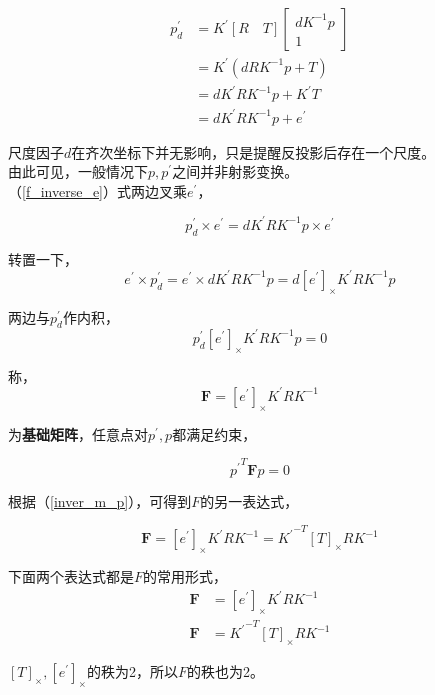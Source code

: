 		\begin{align}
			p^{\prime}_d &= K^{\prime}[R\quad T]
			\begin{bmatrix}
				dK^{-1}p\\
				1
			\end{bmatrix}\nonumber\\
			&= K^{\prime}\left(dRK^{-1}p + T\right)\nonumber\\
			&= dK^{\prime}RK^{-1}p + K^{\prime}T\label{f_inverse}\\
			&= dK^{\prime}RK^{-1}p + e^\prime\label{f_inverse_e}
		\end{align}

		尺度因子$d$在齐次坐标下并无影响，只是提醒反投影后存在一个尺度。\\

		由此可见，一般情况下$p,p^\prime$之间并非射影变换。\\

		（\ref{f_inverse_e}）式两边叉乘$e^\prime$，

		$$
			p^{\prime}_d\times e^\prime = dK^{\prime}RK^{-1}p \times e^\prime
		$$

		转置一下，
		$$
			e^\prime \times p^{\prime}_d = e^\prime \times dK^{\prime}RK^{-1}p = d[e^\prime]_{\times}K^{\prime}RK^{-1}p
		$$

		两边与$p^\prime_d$作内积，
		$$
			p^\prime_d [e^\prime]_{\times}K^{\prime}RK^{-1}p = 0
		$$

		称，
		\begin{equation*}
			\mathbf{F} = [e^\prime]_{\times}K^{\prime}RK^{-1}
		\end{equation*}

		为\textbf{基础矩阵}，任意点对$p^\prime,p$都满足约束，

		\begin{equation}
			{p^{\prime}}^T \mathbf{F} p = 0 \label{f_constrain}
		\end{equation}

		根据（\ref{inver_m_p}），可得到$F$的另一表达式，

		$$
			\mathbf{F} = [e^\prime]_{\times}K^{\prime}RK^{-1} = {K^{\prime}}^{-T}[T]_{\times}RK^{-1}
		$$

		下面两个表达式都是$F$的常用形式，
		\begin{align}
			\mathbf{F} &= [e^\prime]_{\times}K^{\prime}RK^{-1} \label{f_1}\\
			\mathbf{F} &= {K^{\prime}}^{-T}[T]_{\times}RK^{-1} \label{f_1}
		\end{align}

		$[T]_{\times},[e^\prime]_{\times}$的秩为2，所以$F$的秩也为2。\\

